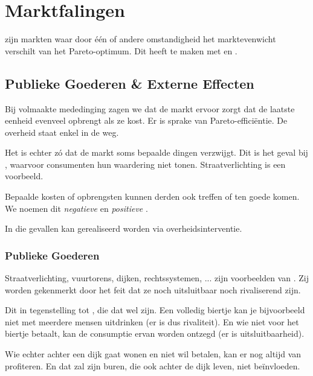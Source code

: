 \section{Marktfalingen}

 zijn markten waar door \'e\'en of andere omstandigheid het marktevenwicht verschilt van het Pareto-optimum. Dit heeft te maken met  en . 

\subsection{Publieke Goederen \& Externe Effecten}\label{sec:pubext}

Bij volmaakte mededinging zagen we dat de markt ervoor zorgt dat de laatste eenheid evenveel opbrengt als ze kost. Er is sprake van Pareto-effici\"entie. De overheid staat enkel in de weg.\\

\par Het is echter z\'o dat de markt soms bepaalde dingen verzwijgt. Dit is het geval bij , waarvoor consumenten hun waardering niet tonen. Straatverlichting is een voorbeeld. 
\par Bepaalde kosten of opbrengsten kunnen derden ook treffen of ten goede komen. We noemen dit \textit{negatieve} en \textit{positieve} .\\

\par In die gevallen kan  gerealiseerd worden via overheidsinterventie. 

\subsubsection{Publieke Goederen}

Straatverlichting, vuurtorens, dijken, rechtssystemen, ... zijn voorbeelden van . Zij worden gekenmerkt door het feit dat ze noch uitsluitbaar noch rivaliserend zijn.
\par Dit in tegenstelling tot , die dat wel zijn. Een volledig biertje kan je bijvoorbeeld niet met meerdere mensen uitdrinken (er is dus rivaliteit). En wie niet voor het biertje betaalt, kan de consumptie ervan worden ontzegd (er is uitsluitbaarheid).
\par Wie echter achter een dijk gaat wonen en niet wil betalen, kan er nog altijd van profiteren. En dat zal zijn buren, die ook achter de dijk leven, niet be\"invloeden.\\

